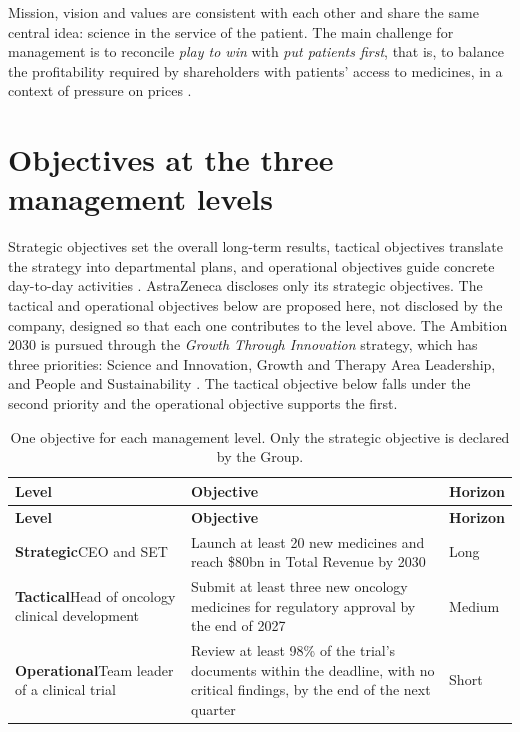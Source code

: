 \begin{analysis}
Mission, vision and values are consistent with each other and share the same central idea: science in the service of the patient. The main challenge for management is to reconcile \textit{play to win} with \textit{put patients first}, that is, to balance the profitability required by shareholders with patients' access to medicines, in a context of pressure on prices \cite[pp.~32--33]{AR}.
\end{analysis}

\section{Objectives at the three management levels}\label{sec:objetivos}
Strategic objectives set the overall long-term results, tactical objectives translate the strategy into departmental plans, and operational objectives guide concrete day-to-day activities \cite[pp.~5--9]{PLAN}. AstraZeneca discloses only its strategic objectives. The tactical and operational objectives below are proposed here, not disclosed by the company, designed so that each one contributes to the level above. The Ambition 2030 is pursued through the \textit{Growth Through Innovation} strategy, which has three priorities: Science and Innovation, Growth and Therapy Area Leadership, and People and Sustainability \cite[p.~10]{AR}. The tactical objective below falls under the second priority and the operational objective supports the first.

\begin{xltabular}{\linewidth}{@{}N{3.1cm}Yl@{}}
\caption{One objective for each management level. Only the strategic objective is declared by the Group.}\label{tab:objetivos}\\*
\toprule
\textbf{Level} & \textbf{Objective} & \textbf{Horizon} \\*
\midrule
\endfirsthead
\toprule
\textbf{Level} & \textbf{Objective} & \textbf{Horizon} \\*
\midrule
\endhead
\bottomrule
\endfoot
\textbf{Strategic}\newline CEO and SET & Launch at least 20 new medicines and reach \$80bn in Total Revenue by 2030 \cite[p.~10]{AR} & Long \\
\textbf{Tactical}\newline Head of oncology clinical development & Submit at least three new oncology medicines for regulatory approval by the end of 2027 & Medium \\
\textbf{Operational}\newline Team leader of a clinical trial & Review at least 98\% of the trial's documents within the deadline, with no critical findings, by the end of the next quarter & Short \\
\end{xltabular}

